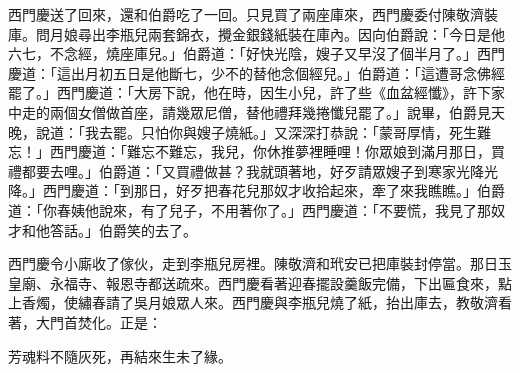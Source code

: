 西門慶送了回來，還和伯爵吃了一回。只見買了兩座庫來，西門慶委付陳敬濟裝庫。問月娘尋出李瓶兒兩套錦衣，攪金銀錢紙裝在庫內。因向伯爵說：「今日是他六七，不念經，燒座庫兒。」伯爵道：「好快光陰，嫂子又早沒了個半月了。」西門慶道：「這出月初五日是他斷七，少不的替他念個經兒。」伯爵道：「這遭哥念佛經罷了。」西門慶道：「大房下說，他在時，因生小兒，許了些《血盆經懺》，許下家中走的兩個女僧做首座，請幾眾尼僧，替他禮拜幾捲懺兒罷了。」說畢，伯爵見天晚，說道：「我去罷。只怕你與嫂子燒紙。」又深深打恭說：「蒙哥厚情，死生難忘！」西門慶道：「難忘不難忘，我兒，你休推夢裡睡哩！你眾娘到滿月那日，買禮都要去哩。」伯爵道：「又買禮做甚？我就頭著地，好歹請眾嫂子到寒家光降光降。」西門慶道：「到那日，好歹把春花兒那奴才收拾起來，牽了來我瞧瞧。」伯爵道：「你春姨他說來，有了兒子，不用著你了。」西門慶道：「不要慌，我見了那奴才和他答話。」伯爵笑的去了。

西門慶令小廝收了傢伙，走到李瓶兒房裡。陳敬濟和玳安已把庫裝封停當。那日玉皇廟、永福寺、報恩寺都送疏來。西門慶看著迎春擺設羹飯完備，下出匾食來，點上香燭，使繡春請了吳月娘眾人來。西門慶與李瓶兒燒了紙，抬出庫去，教敬濟看著，大門首焚化。正是：

芳魂料不隨灰死，再結來生未了緣。

